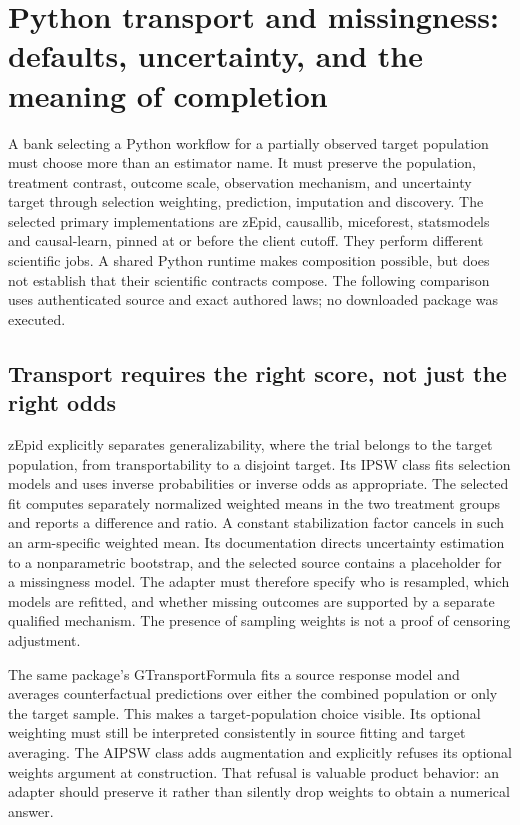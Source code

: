 \section[Python transport and missingness contracts]{Python transport and missingness: defaults, uncertainty, and the meaning of completion}
\label{sec:exec25-ptm}

A bank selecting a Python workflow for a partially observed target population must choose more than an estimator name. It must preserve the population, treatment contrast, outcome scale, observation mechanism, and uncertainty target through selection weighting, prediction, imputation and discovery. The selected primary implementations are zEpid, causallib, miceforest, statsmodels and causal-learn, pinned at or before the client cutoff. They perform different scientific jobs. A shared Python runtime makes composition possible, but does not establish that their scientific contracts compose. The following comparison uses authenticated source and exact authored laws; no downloaded package was executed.~\citep{exec25_ptm_zepid,exec25_ptm_causallib,exec25_ptm_miceforest,exec25_ptm_statsmodels,exec25_ptm_causallearn}

\subsection{Transport requires the right score, not just the right odds}

zEpid explicitly separates generalizability, where the trial belongs to the target population, from transportability to a disjoint target. Its IPSW class fits selection models and uses inverse probabilities or inverse odds as appropriate. The selected fit computes separately normalized weighted means in the two treatment groups and reports a difference and ratio. A constant stabilization factor cancels in such an arm-specific weighted mean. Its documentation directs uncertainty estimation to a nonparametric bootstrap, and the selected source contains a placeholder for a missingness model. The adapter must therefore specify who is resampled, which models are refitted, and whether missing outcomes are supported by a separate qualified mechanism. The presence of sampling weights is not a proof of censoring adjustment.~\citep{exec25_ptm_zepid}

The same package's GTransportFormula fits a source response model and averages counterfactual predictions over either the combined population or only the target sample. This makes a target-population choice visible. Its optional weighting must still be interpreted consistently in source fitting and target averaging. The AIPSW class adds augmentation and explicitly refuses its optional weights argument at construction. That refusal is valuable product behavior: an adapter should preserve it rather than silently drop weights to obtain a numerical answer.~\citep{exec25_ptm_zepid}

